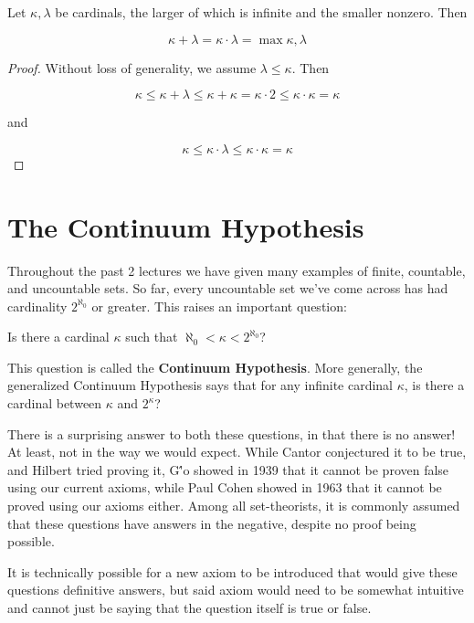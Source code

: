 \begin{theorem}
    Let $\kappa, \lambda$ be cardinals, the larger of which is infinite and the smaller nonzero. Then 

    \[\kappa + \lambda = \kappa \cdot \lambda = \max{\kappa, \lambda}\]
\end{theorem}

\begin{proof}
    Without loss of generality, we assume $\lambda \leq \kappa$. Then 

    \[\kappa \leq \kappa + \lambda \leq \kappa + \kappa = \kappa \cdot 2 \leq \kappa \cdot \kappa = \kappa \]

    and
    
    \[\kappa \leq \kappa \cdot \lambda \leq \kappa \cdot \kappa = \kappa\]
\end{proof}

\section{The Continuum Hypothesis}

Throughout the past 2 lectures we have given many examples of finite, countable, and uncountable sets. So far, every uncountable set we've come across has had cardinality $2^{\aleph_0}$ or greater. This raises an important question: 

\begin{center}
    Is there a cardinal $\kappa$ such that $\aleph_0 < \kappa < 2^{\aleph_0}$?
\end{center}

This question is called the \textbf{Continuum Hypothesis}. More generally, the generalized Continuum Hypothesis says that for any infinite cardinal $\kappa$, is there a cardinal between $\kappa$ and $2^\kappa$? 

There is a surprising answer to both these questions, in that there is no answer! At least, not in the way we would expect. While Cantor conjectured it to be true, and Hilbert tried proving it, G\''{o} showed in 1939 that it cannot be proven false using our current axioms, while Paul Cohen showed in 1963 that it cannot be proved using our axioms either. Among all set-theorists, it is commonly assumed that these questions have answers in the negative, despite no proof being possible. 

It is technically possible for a new axiom to be introduced that would give these questions definitive answers, but said axiom would need to be somewhat intuitive and cannot just be saying that the question itself is true or false. 